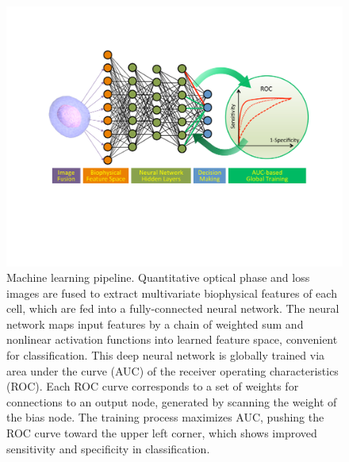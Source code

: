 \documentclass[aps,pra,reprint,superscriptaddress]{revtex4-1}
\begin{document}
\begin{figure}
\includegraphics[scale=0.7]{FigureNeuralNet.pdf}
\caption{\label{fig:NeuralNet} Machine learning pipeline. Quantitative optical phase and loss images are fused to extract multivariate biophysical features of each cell, which are fed into a fully-connected neural network. The neural network maps input features by a chain of weighted sum and nonlinear activation functions into learned feature space, convenient for classification. This deep neural network is globally trained via area under the curve (AUC) of the receiver operating characteristics (ROC). Each ROC curve corresponds to a set of weights for connections to an output node, generated by scanning the weight of the bias node. The training process maximizes AUC, pushing the ROC curve toward the upper left corner, which shows improved sensitivity and specificity in classification.}
\end{figure}
\end{document}
